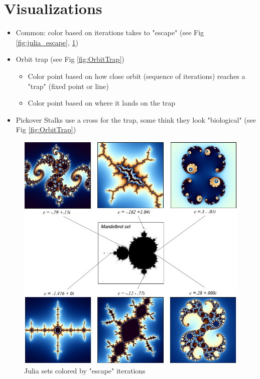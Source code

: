 \documentclass{article}
\begin{document}
\section{Visualizations}

\begin{itemize}
    \item Common: color based on iterations takes to "escape" (see Fig \ref{fig:julia_escape}, \ref{fig:JuliaAndMandelbrot})
    \item Orbit trap (see Fig \ref{fig:OrbitTrap})
    \begin{itemize}
        \item Color point based on how close orbit (sequence of iterations) reaches a "trap" (fixed point or line) 
        \item Color point based on where it lands on the trap
    \end{itemize}
    \item Pickover Stalks use a cross for the trap, some think they look "biological" (see Fig \ref{fig:OrbitTrap}) 
\end{itemize}


\begin{figure}[!htbp]
    \centering
    \includegraphics[width=.8\linewidth]{images/julias-and-mandelbrot-karlsims.jpg}
    \caption{Julia sets colored by "escape" iterations \cite{KarlSims}} %
    \label{fig:JuliaAndMandelbrot}
\end{figure}
\end{document}
